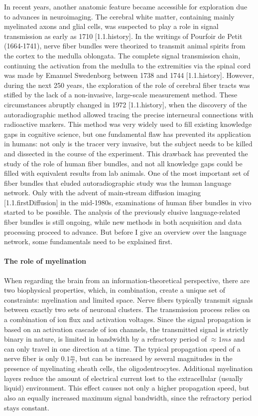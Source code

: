 In recent years, another anatomic feature became accessible for exploration due to advances in neuroimaging.
The cerebral white matter, containing mainly myelinated axons and glial cells, was suspected to play a role in signal transmission as early as 1710 [1.1.history].
In the writings of Pourfoir de Petit (1664-1741), nerve fiber bundles were theorized to transmit animal spirits from the cortex to the medulla oblongata.
The complete signal transmission chain, continuing the activation from the medulla to the extremities via the spinal cord was made by Emanuel Swedenborg between 1738 and 1744 [1.1.history].
However, during the next 250 years, the exploration of the role of cerebral fiber tracts was stifled by the lack of a non-invasive, large-scale measurement method.
These circumstances abruptly changed in 1972 [1.1.history], when the discovery of the autoradiographic method allowed tracing the precise interneural connections with radioactive markers.
This method was very widely used to fill existing knowledge gaps in cognitive science, but one fundamental flaw has prevented its application in humans: not only is the tracer very invasive, but the subject needs to be killed and dissected in the course of the experiment.
This drawback has prevented the study of the role of human fiber bundles, and not all knowledge gaps could be filled with equivalent results from lab animals.
One of the most important set of fiber bundles that eluded autoradiographic study was the human language network.
Only with the advent of main-stream diffusion imaging [1.1.firstDiffusion] in the mid-1980s, examinations of human fiber bundles in vivo started to be possible.
The analysis of the previously elusive language-related fiber bundles is still ongoing, while new methods in both acquisition and data processing proceed to advance.
But before I give an overview over the language network, some fundamentals need to be explained first.

\paragraph{The role of myelination}
When regarding the brain from an information-theoretical perspective, there are two biophysical properties, which, in combination, create a unique set of constraints: myelination and limited space.
Nerve fibers typically transmit signals between exactly two sets of neuronal clusters.
The transmission process relies on a combination of ion flux and activation voltages.
Since the signal propagation is based on an activation cascade of ion channels, the transmitted signal is strictly binary in nature, is limited in bandwidth by a refractory period of $\approx 1ms$ and can only travel in one direction at a time.
The typical propagation speed of a nerve fiber is only $0.1\frac{m}{s}$, but can be increased by several magnitudes in the presence of myelinating sheath cells, the oligodentrocytes.
Additional myelination layers reduce the amount of electrical current lost to the extracellular (usually liquid) environment.
This effect causes not only a higher propagation speed, but also an equally increased maximum signal bandwidth, since the refractory period stays constant.

